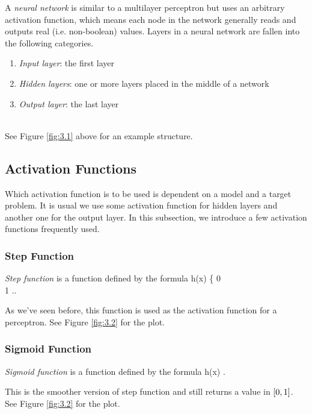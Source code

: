 \documentclass{article}
\theoremstyle{definition}
\newcommand{\fig}[1]{Figure \ref{fig:#1}}
\begin{document}
A {\it neural network} is similar to a multilayer perceptron but uses an arbitrary activation function, which means each node in the network generally reads and outputs real (i.e. non-boolean) values. Layers in a neural network are fallen into the following categories.
\begin{enumerate}
\item {\it Input layer}: the first layer
\item {\it Hidden layers}: one or more layers placed in the middle of a network
\item {\it Output layer}: the last layer
\end{enumerate}

\ \\[-3mm]\indent
See \fig{3.1} above for an example structure.

\subsection{Activation Functions}

Which activation function is to be used is dependent on a model and a target problem. It is usual we use some activation function for hidden layers and another one for the output layer. In this subsection, we introduce a few activation functions frequently used.

\subsubsection{Step Function}

{\it Step function} is a function defined by the formula
\begineq
h(x) \equiv \left\{  0  \\ 1  \edarray \right.. 
\edeq

As we've seen before, this function is used as the activation function for a perceptron. See \fig{3.2} for the plot.

\subsubsection{Sigmoid Function} \label{section:3.2.2}

{\it Sigmoid function} is a function defined by the formula
\begineq
h(x) \equiv {} . 
\edeq

This is the smoother version of step function and still returns a value in $\left[ 0, 1 \right]$. See \fig{3.2} for the plot.
\end{document}
